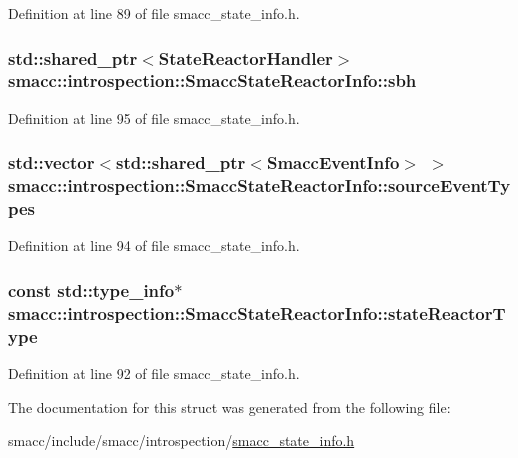 Definition at line 89 of file smacc\+\_\+state\+\_\+info.\+h.

\subsubsection[{\texorpdfstring{sbh}{sbh}}]{\setlength{\rightskip}{0pt plus 5cm}std\+::shared\+\_\+ptr$<${\bf State\+Reactor\+Handler}$>$ smacc\+::introspection\+::\+Smacc\+State\+Reactor\+Info\+::sbh}\hypertarget{structsmacc_1_1introspection_1_1SmaccStateReactorInfo_a6a112865af683d44f4eb824f54656a26}{}\label{structsmacc_1_1introspection_1_1SmaccStateReactorInfo_a6a112865af683d44f4eb824f54656a26}


Definition at line 95 of file smacc\+\_\+state\+\_\+info.\+h.

\subsubsection[{\texorpdfstring{source\+Event\+Types}{sourceEventTypes}}]{\setlength{\rightskip}{0pt plus 5cm}std\+::vector$<$std\+::shared\+\_\+ptr$<${\bf Smacc\+Event\+Info}$>$ $>$ smacc\+::introspection\+::\+Smacc\+State\+Reactor\+Info\+::source\+Event\+Types}\hypertarget{structsmacc_1_1introspection_1_1SmaccStateReactorInfo_a66cb20b15e0ad0fbfd5ad20b83462eb6}{}\label{structsmacc_1_1introspection_1_1SmaccStateReactorInfo_a66cb20b15e0ad0fbfd5ad20b83462eb6}


Definition at line 94 of file smacc\+\_\+state\+\_\+info.\+h.

\subsubsection[{\texorpdfstring{state\+Reactor\+Type}{stateReactorType}}]{\setlength{\rightskip}{0pt plus 5cm}const std\+::type\+\_\+info$\ast$ smacc\+::introspection\+::\+Smacc\+State\+Reactor\+Info\+::state\+Reactor\+Type}\hypertarget{structsmacc_1_1introspection_1_1SmaccStateReactorInfo_a02de210fcdffd81424537d4d8a330609}{}\label{structsmacc_1_1introspection_1_1SmaccStateReactorInfo_a02de210fcdffd81424537d4d8a330609}


Definition at line 92 of file smacc\+\_\+state\+\_\+info.\+h.



The documentation for this struct was generated from the following file\+:\begin{DoxyCompactItemize}
\item 
smacc/include/smacc/introspection/\hyperlink{smacc__state__info_8h}{smacc\+\_\+state\+\_\+info.\+h}\end{DoxyCompactItemize}
